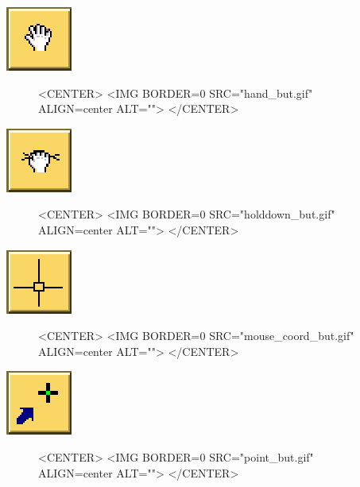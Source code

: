 \begin{ccTexOnly}
\mbox{\includegraphics{hand_but.eps}}
\end{ccTexOnly}
\begin{figure}
\begin{ccHtmlOnly}
<CENTER>
<IMG BORDER=0 SRC="hand_but.gif"  ALIGN=center  ALT="">
</CENTER>
\end{ccHtmlOnly}
\end{figure}

\begin{ccTexOnly}
\mbox{\includegraphics{holddown_but.eps}}
\end{ccTexOnly}
\begin{figure}
\begin{ccHtmlOnly}
<CENTER>
<IMG BORDER=0 SRC="holddown_but.gif"  ALIGN=center  ALT="">
</CENTER>
\end{ccHtmlOnly}
\end{figure}

\begin{ccTexOnly}
\mbox{\includegraphics{mouse_coord_but.eps}}
\end{ccTexOnly}
\begin{figure}
\begin{ccHtmlOnly}
<CENTER>
<IMG BORDER=0 SRC="mouse_coord_but.gif"  ALIGN=center  ALT="">
</CENTER>
\end{ccHtmlOnly}
\end{figure}

\begin{ccTexOnly}
\mbox{\includegraphics{point_but.eps}}
\end{ccTexOnly}
\begin{figure}
\begin{ccHtmlOnly}
<CENTER>
<IMG BORDER=0 SRC="point_but.gif"  ALIGN=center  ALT="">
</CENTER>
\end{ccHtmlOnly}
\end{figure}

